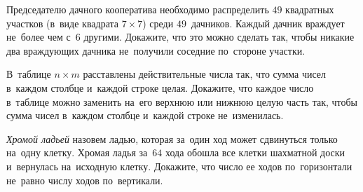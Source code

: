 \begin{problems}
\item
Председателю дачного кооператива необходимо распределить $49$ квадратных
участков (в~виде квадрата $7 \times 7$) среди $49$~дачников.
Каждый дачник враждует не~более чем с~$6$ другими.
Докажите, что это можно сделать так, чтобы никакие два враждующих дачника
не~получили соседние по~стороне участки.

\item
В~таблице $n \times m$ расставлены действительные числа так, что сумма чисел
в~каждом столбце и~каждой строке целая.
Докажите, что каждое число в~таблице можно заменить на~его верхнюю или нижнюю
целую часть так, чтобы сумма чисел в~каждом столбце и~каждой строке
не~изменилась.

\item
\emph{Хромой ладьей} назовем ладью, которая за~один ход может сдвинуться только
на~одну клетку.
Хромая ладья за~$64$ хода обошла все клетки шахматной доски и~вернулась
на~исходную клетку.
Докажите, что число ее ходов по~горизонтали не~равно числу ходов по~вертикали.


\end{problems}

